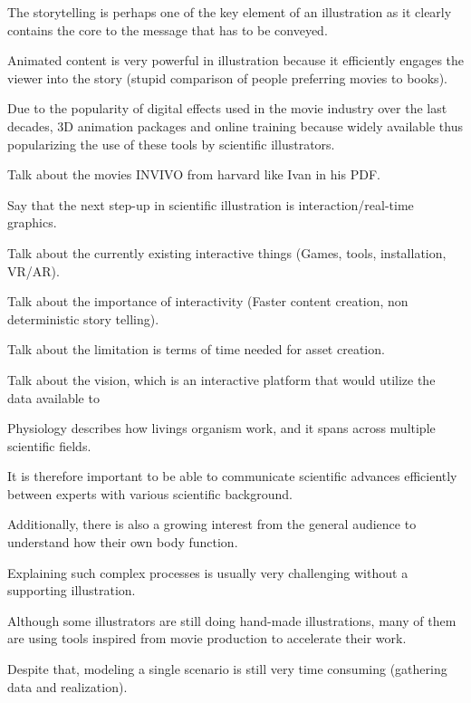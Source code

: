 The storytelling is perhaps one of the key element of an illustration as it clearly contains the core to the message that has to be conveyed.

Animated content is very powerful in illustration because it efficiently engages the viewer into the story (stupid comparison of people preferring movies to books).

Due to the popularity of digital effects used in the movie industry over the last decades, 3D animation packages and online training because widely available thus popularizing the use of these tools by scientific illustrators.

Talk about the movies INVIVO from harvard like Ivan in his PDF.

Say that the next step-up in scientific illustration is interaction/real-time graphics.

Talk about the currently existing interactive things (Games, tools, installation, VR/AR).

Talk about the importance of interactivity (Faster content creation, non deterministic story telling).

Talk about the limitation is terms of time needed for asset creation.

Talk about the vision, which is an interactive platform that would utilize the data available to  
















Physiology describes how livings organism work, and it spans across multiple scientific fields.

It is therefore important to be able to communicate scientific advances efficiently between experts with various scientific background.

Additionally, there is also a growing interest from the general audience to understand how their own body function.

Explaining such complex processes is usually very challenging without a supporting illustration.

Although some illustrators are still doing hand-made illustrations, many of them are using tools inspired from movie production to accelerate their work.

Despite that, modeling a single scenario is still very time consuming (gathering data and realization).

